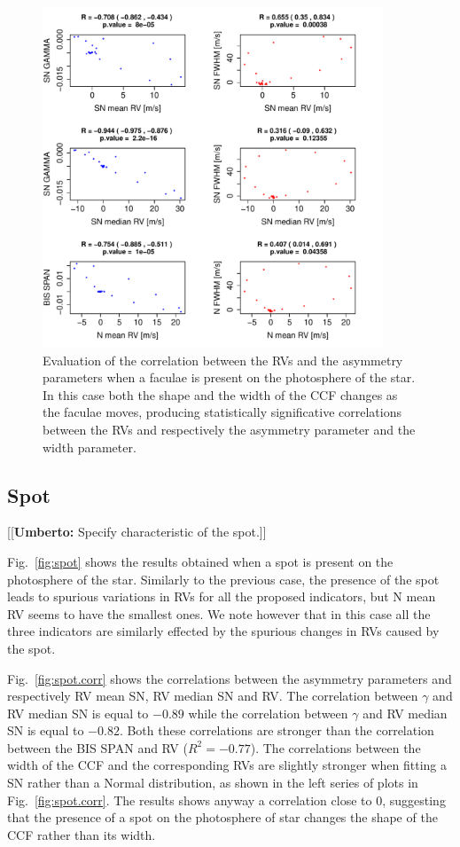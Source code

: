 \documentclass[11pt, oneside]{article}
\newcommand{\umberto}[1]{{\color{green}[[\textbf{Umberto: }#1]]}}
\begin{document}
{\begin{figure}[htbp]
   \centering
\includegraphics[height = 4in]{SOAP_FACULAE_Comparison_para_SN.pdf} 
   \caption{Evaluation of the correlation between the RVs and the asymmetry parameters when a faculae is present on the photosphere of the star. In this case both the shape and the width of the CCF changes as the faculae moves, producing statistically significative correlations between the RVs and respectively the asymmetry parameter and the width parameter.}
    \label{fig:faculae.corr}
\end{figure}

\subsection{Spot} \label{sec:soap.spot}

\umberto{Specify characteristic of the spot.}

Fig.~\ref{fig:spot} shows the results obtained when a spot is present on the photosphere of the star. Similarly to the previous case, the presence of the spot leads to spurious variations in RVs for all the proposed indicators, but N mean RV seems to have the smallest ones. We note however that in this case all the three indicators are similarly effected by the spurious changes in RVs caused by the spot. %

Fig.~\ref{fig:spot.corr} shows the correlations between the asymmetry parameters and respectively RV mean SN, RV median SN and RV. The correlation between $\gamma$ and RV median SN is equal to $-0.89$ while the correlation between $\gamma$ and RV median SN is equal to $-0.82$. Both these correlations are stronger than the correlation between the BIS SPAN and RV ($R^2=-0.77$). The correlations between the width of the CCF and the corresponding RVs are slightly stronger when fitting a SN rather than a Normal distribution, as shown in the left series of plots in Fig.~\ref{fig:spot.corr}. The results shows anyway a correlation close to $0$, suggesting that the presence of a spot on the photosphere of star changes the shape of the CCF rather than its width.

}
\end{document}
